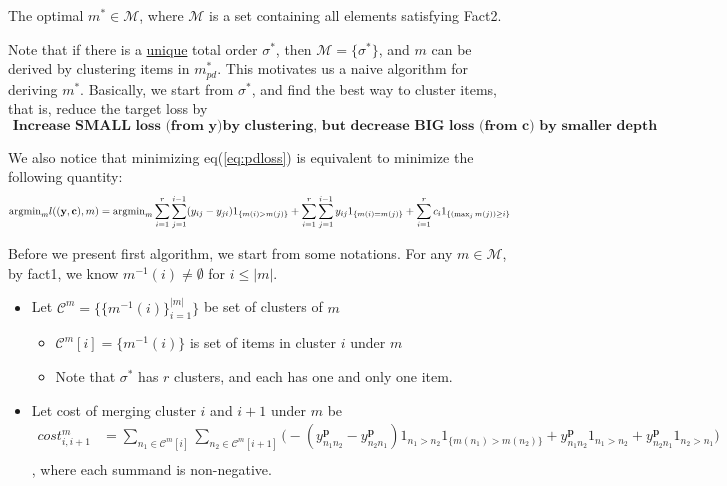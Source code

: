 \begin{lemma}
	The optimal $m^*\in\mathcal{M}$, where  $\mathcal{M}$ is a set containing all elements satisfying Fact2.
\end{lemma}

Note that if there is a \underline{unique} total order $\sigma^*$, then $\mathcal{M}=\{\sigma^*\}$, and $m$ can be derived by clustering items in $m^*_{pd}$. This motivates us a naive algorithm for deriving $m^*$. Basically, we start from $\sigma^*$, and find the best way to cluster items, that is, reduce the target loss by 
$$\textbf{ Increase SMALL loss (from $\mathbf{y}$)by clustering, but decrease BIG loss (from $\mathbf{c}$) by smaller depth }$$

We also notice that minimizing eq(\ref{eq:pdloss}) is equivalent to minimize the following quantity:
	\begin{equation*}
	\text{argmin}_ml((\mathbf{y},\mathbf{c}),  m)= \text{argmin}_m\sum\limits_{i=1}^r\sum\limits_{j=1}^{i-1}(y_{ij}-y_{ji})1_{\{m(i)> m(j)\}}+\sum\limits_{i=1}^r\sum\limits_{j=1}^{i-1}y_{ij}1_{\{m(i)= m(j)\}}+\sum\limits_{i=1}^rc_i1_{\{(\max_jm(j))\geq i\}}\\
	\end{equation*} 

Before we present first algorithm, we start from some notations. For any $m\in \mathcal{M}$, by fact1, we know $m^{-1}(i)\not=\emptyset$ for $i\leq |m|$. 
\begin{itemize}
	\item Let $\mathcal{C}^m=\{  \{m^{-1}(i)\}_{i=1}^{|m|}     \}$ be set of clusters of $m$
	\begin{itemize}
		\item $\mathcal{C}^m[i]= \{m^{-1}(i)\}$ is set of items in cluster $i$ under $m$
		\item Note that $\sigma^*$ has $r$ clusters, and each has one  and only one item.
	\end{itemize}
\item Let cost of merging cluster $i$ and $i+1$ under $m$ be \begin{equation}\label{eq:cost}
\begin{split}
cost^m_{i, i+1}&=\sum\limits_{n_1\in \mathcal{C}^m[i]}\sum\limits_{n_2\in \mathcal{C}^m[i+1]}\bigg(-(y_{n_1n_2}^\mathbf{p}-y_{n_2n_1}^\mathbf{p})1_{n_1>n_2}1_{\{m(n_1)> m(n_2)\}}+y_{n_1n_2}^\mathbf{p}1_{n_1>n_2}+y_{n_2n_1}^\mathbf{p}1_{n_2>n_1}\bigg)\\
\end{split}
\end{equation}
, where each summand is non-negative.
\end{itemize}

